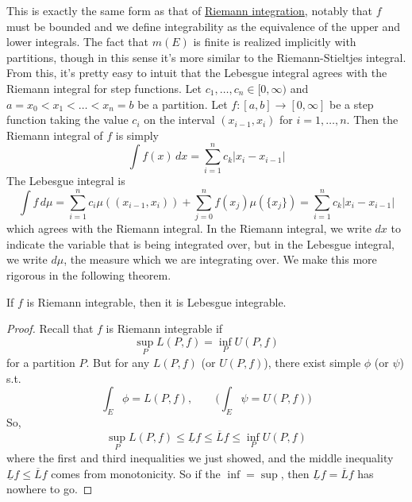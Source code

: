   This is exactly the same form as that of \hyperref[real-def:riemann-integral]{Riemann integration}, notably that $f$ must be bounded and we define integrability as the equivalence of the upper and lower integrals. The fact that $m(E)$ is finite is realized implicitly with partitions, though in this sense it's more similar to the Riemann-Stieltjes integral. From this, it's pretty easy to intuit that the Lebesgue integral agrees with the Riemann integral for step functions. Let $c_1, \ldots, c_n \in [0, \infty)$ and $a = x_0 < x_1 < \ldots < x_n = b$ be a partition. Let $f: [a, b] \longrightarrow [0, \infty]$ be a step function taking the value $c_i$ on the interval $(x_{i-1}, x_i)$ for $i = 1, \ldots, n$. Then the Riemann integral of $f$ is simply 
  \begin{equation}
    \int f(x) \,dx = \sum_{i=1}^n c_k |x_i - x_{i-1}|
  \end{equation}
  The Lebesgue integral is 
  \begin{equation}
    \int f \, d \mu = \sum_{i=1}^n c_i \mu((x_{i-1}, x_i)) + \sum_{j=0}^n f(x_j) \mu(\{x_j\}) = \sum_{i=1}^n c_k |x_i - x_{i-1}|
  \end{equation}
  which agrees with the Riemann integral. In the Riemann integral, we write $dx$ to indicate the variable that is being integrated over, but in the Lebesgue integral, we write $d \mu$, the measure which we are integrating over. We make this more rigorous in the following theorem.  

  \begin{theorem}
    If $f$ is Riemann integrable, then it is Lebesgue integrable. 
  \end{theorem}
  \begin{proof}
    Recall that $f$ is Riemann integrable if 
    \begin{equation}
      \sup_P L(P, f) = \inf_P U(P, f)
    \end{equation} 
    for a partition $P$. But for any $L(P, f)$ (or $U(P, f)$), there exist simple $\phi$ (or $\psi$) s.t. 
    \begin{equation}
      \int_E \phi = L(P, f), \qquad \bigg( \int_E \psi = U(P, f) \bigg)
    \end{equation}
    So, 
    \begin{equation}
      \sup_P L(P, f) \leq \underline{L} f \leq \overline{L} f \leq \inf_P U(P, f) 
    \end{equation}
    where the first and third inequalities we just showed, and the middle inequality $\underline{L} f \leq \overline{L} f$ comes from monotonicity. So if the $\inf = \sup$, then $\underline{L} f = \overline{L} f$ has nowhere to go. 
  \end{proof} 

